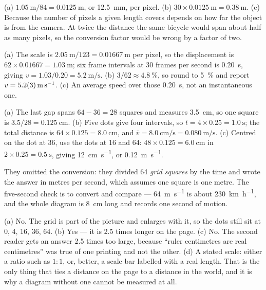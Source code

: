 \documentclass[11pt,twoside,openany]{book}
\newcounter{check}[chapter]
\begin{document}
\begin{description}[leftmargin=2.6em,itemsep=3pt,style=sameline]
  \item[1.10] (a) $\SI{1.05}{\metre}/84 = \SI{0.0125}{\metre}$, or \SI{12.5}{\milli\metre}, per pixel. (b) $30 \times \SI{0.0125}{\metre} = \SI{0.38}{\metre}$. (c) Because the number of pixels a given length covers depends on how far the object is from the camera. At twice the distance the same bicycle would span about half as many pixels, so the conversion factor would be wrong by a factor of two.
  \item[1.11] (a) The scale is $\SI{2.05}{\metre}/123 = \SI{0.01667}{\metre}$ per pixel, so the displacement is $62 \times 0.01667 = \SI{1.03}{\metre}$; six frame intervals at \num{30} frames per second is \SI{0.20}{\second}, giving $v = 1.03/0.20 = \SI{5.2}{\metre\per\second}$. (b) $3/62 \approx \SI{4.8}{\percent}$, so round to \SI{5}{\percent} and report $v = \SI{5.2 \pm 0.3}{\metre\per\second}$. (c) An average speed over those \SI{0.20}{\second}, not an instantaneous one.
  \item[1.12] (a) The last gap spans $64 - 36 = 28$ squares and measures \SI{3.5}{\centi\metre}, so one square is $3.5/28 = \SI{0.125}{\centi\metre}$. (b) Five dots give four intervals, so $t = 4 \times 0.25 = \SI{1.0}{\second}$; the total distance is $64 \times 0.125 = \SI{8.0}{\centi\metre}$, and $\bar v = \SI{8.0}{\centi\metre\per\second} = \SI{0.080}{\metre\per\second}$. (c) Centred on the dot at \num{36}, use the dots at \num{16} and \num{64}: $48 \times 0.125 = \SI{6.0}{\centi\metre}$ in $2 \times 0.25 = \SI{0.5}{\second}$, giving \SI{12}{\centi\metre\per\second}, or \SI{0.12}{\metre\per\second}.
  \item[1.13] They omitted the conversion: they divided \num{64} \emph{grid squares} by the time and wrote the answer in metres per second, which assumes one square is one metre. The five-second check is to convert and compare --- \SI{64}{\metre\per\second} is about \SI{230}{\kilo\metre\per\hour}, and the whole diagram is \SI{8}{\centi\metre} long and records one second of motion.
  \item[1.14] (a) No. The grid is part of the picture and enlarges with it, so the dots still sit at \num{0}, \num{4}, \num{16}, \num{36}, \num{64}. (b) Yes --- it is \num{2.5} times longer on the page. (c) No. The second reader gets an answer \num{2.5} times too large, because ``ruler centimetres are real centimetres'' was true of one printing and not the other. (d) A stated scale: either a ratio such as $1:1$, or, better, a scale bar labelled with a real length. That is the only thing that ties a distance on the page to a distance in the world, and it is why a diagram without one cannot be measured at all.

\end{description}
\end{document}
